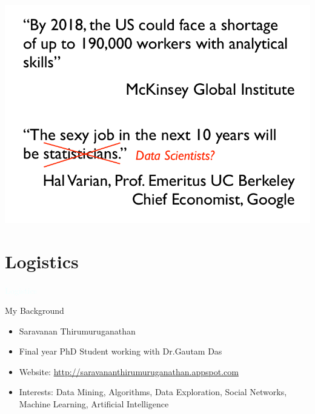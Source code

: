 \documentclass{beamer}
\newcommand{\thblue}[1]{{\Huge {\textcolor{azure}{#1}}}}
\begin{document}
\begin{frame}
    \begin{center}
        \includegraphics[scale=0.3]{dmJobs.png}
    \end{center}
\end{frame}


\section{Logistics}

\begin{frame}{}
    \begin{center}
        \thblue{Logistics}
    \end{center}
\end{frame}

\begin{frame}{My Background}
    \begin{itemize}
        \item Saravanan Thirumuruganathan
        \item Final year PhD Student working with Dr.Gautam Das
        \item Website: \url{http://saravananthirumuruganathan.appspot.com}
        \item Interests: Data Mining, Algorithms, Data Exploration, Social Networks, Machine Learning, Artificial Intelligence
    \end{itemize}
\end{frame}
\end{document}

